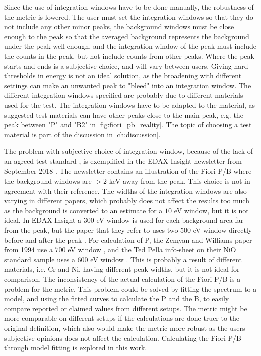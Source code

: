Since the use of integration windows have to be done manually, the robustness of the metric is lowered.
The user must set the integration windows so that they do not include any other minor peaks, the background windows must be close enough to the peak so that the averaged background represents the background under the peak well enough, and the integration window of the peak must include the counts in the peak, but not include counts from other peaks.
Where the peak starts and ends is a subjective choice, and will vary between users.
Giving hard thresholds in energy is not an ideal solution, as the broadening with different settings can make an unwanted peak to "bleed" into an integration window.
The different integration windows specified are probably due to different materials used for the test.
The integration windows have to be adapted to the material, as suggested test materials can have other peaks close to the main peak, e.g. the peak between "P" and "B2" in \cref{fig:fiori_pb_reality}.
The topic of choosing a test material is part of the discussion in \cref{ch:discussion}.



The problem with subjective choice of integration window, because of the lack of an agreed test standard \cite{williams_standard_definitions_1986}, is exemplified in the EDAX Insight newsletter from September 2018 \cite{edax_insight_2018}.
The newsletter contains an illustration of the Fiori P/B where the background windows are $> 2$ keV away from the peak.
This choice is not in agreement with their reference.
The widths of the integration windows are also varying in different papers, which probably does not affect the results too much as the background is converted to an estimate for a $10$ eV window, but it is not ideal.
In EDAX Insight a $300$ eV window is used for each background area far from the peak, but the paper that they refer to uses two 500 eV window directly before and after the peak \cite{egerton_nio_characterization_1994}.
For calculation of P, the Zemyan and Williams paper from 1994 use a $700$ eV window \cite{zemyan_standard_performance_1994}, and the Ted Pella info-sheet on their NiO standard sample uses a $600$ eV window \cite{ted_pella_nio_tem_2019}.
This is probably a result of different materials, i.e. Cr and Ni, having different peak widths, but it is not ideal for comparison.
The inconsistency of the actual calculation of the Fiori P/B is a problem for the metric.
This problem could be solved by fitting the spectrum to a model, and using the fitted curves to calculate the P and the B, to easily compare reported or claimed values from different setups.
The metric might be more comparable on different setups if the calculations are done truer to the original definition, which also would make the metric more robust as the users subjective opinions does not affect the calculation.
Calculating the Fiori P/B through model fitting is explored in this work.





